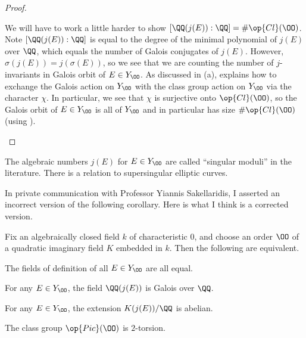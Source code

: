 \documentclass[../notes.tex]{subfiles}
\begin{document}
\begin{proof}
\begin{listalph}
		We will have to work a little harder to show $[\QQ(j(E)):\QQ]=\#\op{Cl}(\OO)$. Note $[\QQ(j(E)):\QQ]$ is equal to the degree of the minimal polynomial of $j(E)$ over $\QQ$, which equals the number of Galois conjugates of $j(E)$. However, $\sigma(j(E))=j(\sigma(E))$, so we see that we are counting the number of $j$-invariants in Galois orbit of $E\in Y_\OO$. As discussed in (a),  explains how to exchange the Galois action on $Y_\OO$ with the class group action on $Y_\OO$ via the character $\chi$. In particular, we see that $\chi$ is surjective onto $\op{Cl}(\OO)$, so the Galois orbit of $E\in Y_\OO$ is all of $Y_\OO$ and in particular has size $\#\op{Cl}(\OO)$ (using ).
		\qedhere
	\end{listalph}
\end{proof}
\begin{remark}
	The algebraic numbers $j(E)$ for $E\in Y_\OO$ are called ``singular moduli'' in the literature. There is a relation to supersingular elliptic curves.
\end{remark}
In private communication with Professor Yiannis Sakellaridis, I asserted an incorrect version of the following corollary. Here is what I think is a corrected version.
\begin{corollary}
	Fix an algebraically closed field $k$ of characteristic $0$, and choose an order $\OO$ of a quadratic imaginary field $K$ embedded in $k$. Then the following are equivalent.
	\begin{listroman}
		\item The fields of definition of all $E\in Y_{\OO}$ are all equal.
		\item For any $E\in Y_{\OO}$, the field $\QQ(j(E))$ is Galois over $\QQ$.
		\item For any $E\in Y_\OO$, the extension $K(j(E))/\QQ$ is abelian.
		\item The class group $\op{Pic}(\OO)$ is $2$-torsion.
	\end{listroman}
\end{corollary}
\end{document}
